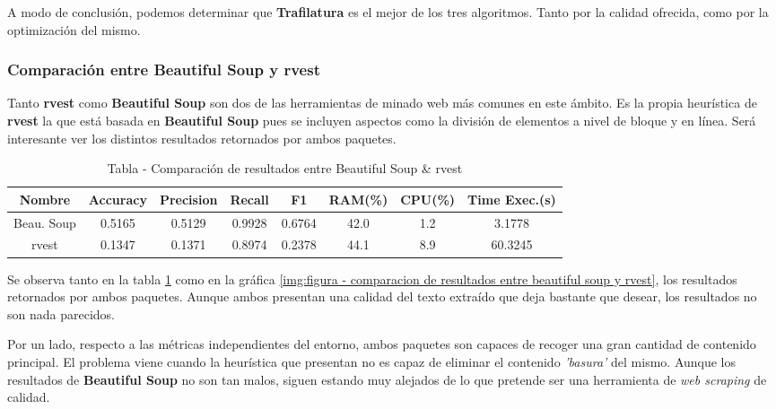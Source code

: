 A modo de conclusión, podemos determinar que \textbf{Trafilatura} es el mejor de los tres algoritmos. Tanto
por la calidad ofrecida, como por la optimización del mismo.

\subsubsection{Comparación entre Beautiful Soup y rvest}
\label{subsec:comparacion entre beautiful soup y rvest}

Tanto \textbf{rvest} como \textbf{Beautiful Soup} son dos de las herramientas de minado web más comunes en
este ámbito. Es la propia heurística de \textbf{rvest} la que está basada en \textbf{Beautiful Soup} pues
se incluyen aspectos como la división de elementos a nivel de bloque y en línea. Será interesante ver los
distintos resultados retornados por ambos paquetes.

\begin{table}[h]
    \begin{center}
      \begin{tabular}{| c | c | c | c | c | c | c | c |} \hline 
       \textbf{Nombre} & \textbf{Accuracy} & \textbf{Precision}  & \textbf{Recall} & \textbf{F1} & \textbf{RAM(\%)} & \textbf{CPU(\%)} & \textbf{Time Exec.(s)} \\ \hline
       Beau. Soup & 0.5165 & 0.5129 & 0.9928 & 0.6764 & 42.0 & 1.2 & 3.1778 \\ \hline
       rvest & 0.1347 & 0.1371 & 0.8974 & 0.2378 & 44.1 & 8.9 & 60.3245 \\ \hline
      \end{tabular}
      \caption{Tabla - Comparación de resultados entre Beautiful Soup \& rvest}
      \label{tab:tabla - comparacion de resultados entre beautiful soup y rvest}
    \end{center}
\end{table}

Se observa tanto en la tabla \ref{tab:tabla - comparacion de resultados entre beautiful soup y rvest} como
en la gráfica \ref{img:figura - comparacion de resultados entre beautiful soup y rvest}, los resultados
retornados por ambos paquetes. Aunque ambos presentan una calidad del texto extraído que deja bastante que
desear, los resultados no son nada parecidos.

Por un lado, respecto a las métricas independientes del entorno, ambos paquetes son capaces de recoger una
gran cantidad de contenido principal. El problema viene cuando la heurística que presentan no es capaz de
eliminar el contenido \emph{'basura'} del mismo. Aunque los resultados de \textbf{Beautiful Soup} no son
tan malos, siguen estando muy alejados de lo que pretende ser una herramienta de \emph{web scraping} de
calidad.

